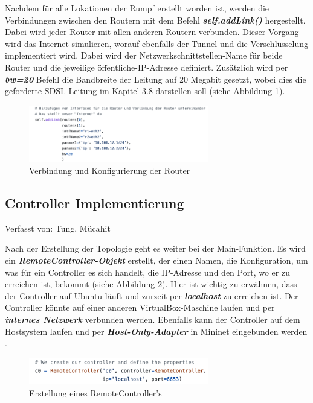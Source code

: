 \documentclass[fontsize=12pt,paper=a4,open=any,parskip=half,
  twoside=false,toc=listof,toc=bibliography,fleqn,leqno,
  captions=nooneline,captions=tableabove,british]{scrbook}
\begin{document}
Nachdem für alle Lokationen der Rumpf erstellt worden ist, werden die Verbindungen zwischen den Routern mit dem Befehl \textit{\textbf{self.addLink()}} hergestellt. Dabei wird jeder Router mit allen anderen Routern verbunden. Dieser Vorgang wird das Internet simulieren, worauf ebenfalls der Tunnel und die Verschlüsselung implementiert wird. Dabei wird der Netzwerkschnittstellen-Name für beide Router und die jeweilige öffentliche-IP-Adresse definiert. Zusätzlich wird per \textit{\textbf{bw=20}} Befehl die Bandbreite der Leitung auf 20 Megabit gesetzt, wobei dies die geforderte SDSL-Leitung im Kapitel 3.8 darstellen soll (siehe Abbildung \ref{mininet4}).

\begin{figure}[H]
 \centering
 \includegraphics[width=0.7\textwidth]{Bilder/mininet4}
 \captionsetup{justification=centering,margin=1cm}
 \caption{Verbindung und Konfigurierung der Router}
 \label{mininet4}
\end{figure}



\subsection{Controller Implementierung}
{\tiny Verfasst von: Tung, Mücahit\par}
Nach der Erstellung der Topologie geht es weiter bei der Main-Funktion. Es wird ein \textit{\textbf{RemoteController-Objekt}} erstellt, der einen Namen, die Konfiguration, um was für ein Controller es sich handelt, die IP-Adresse und den Port, wo er zu erreichen ist, bekommt (siehe Abbildung \ref{mininet5}). Hier ist wichtig zu erwähnen, dass der Controller auf Ubuntu läuft und zurzeit per \textit{\textbf{localhost}} zu erreichen ist. Der Controller könnte auf einer anderen VirtualBox-Maschine laufen und per \textit{\textbf{internes Netzwerk}} verbunden werden. Ebenfalls kann der Controller auf dem Hostsystem laufen und per \textit{\textbf{Host-Only-Adapter}} in Mininet eingebunden werden \cite{mnvm}. 

\begin{figure}[H]
 \centering
 \includegraphics[width=0.7\textwidth]{Bilder/mininet5}
 \captionsetup{justification=centering,margin=1cm}
 \caption{Erstellung eines RemoteController's}
 \label{mininet5}
\end{figure}
\end{document}
